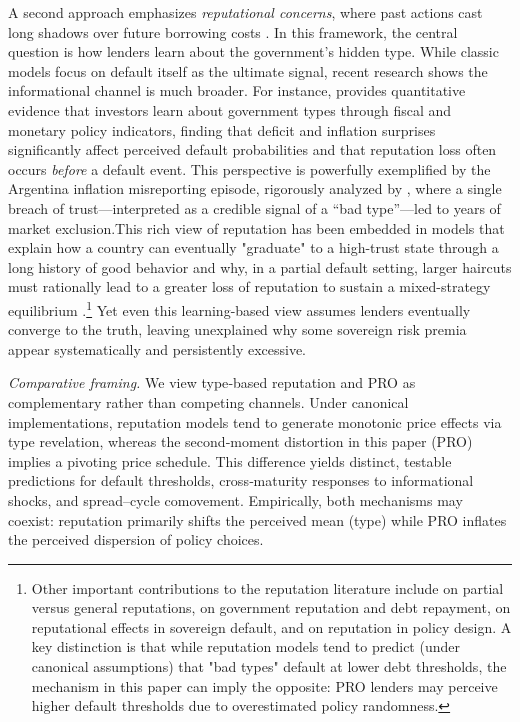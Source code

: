 \documentclass[12pt]{article}
\theoremstyle{plain}
\begin{document}
A second approach emphasizes \textit{reputational concerns}, where past actions
cast long shadows over future borrowing costs \citep{ColeDowEnglish1995,
	Phelan2006}. In this framework, the central question is how lenders learn about
the government's hidden type. While classic models focus on default itself as
the ultimate signal, recent research shows the informational channel is much
broader. For instance, \citep{Fourakis2021} provides quantitative evidence that
investors learn about government types through fiscal and monetary policy
indicators, finding that deficit and inflation surprises significantly affect
perceived default probabilities and that reputation loss often occurs
\textit{before} a default event. This perspective is powerfully exemplified by
the Argentina inflation misreporting episode, rigorously analyzed by
\citep{MorelliMoretti2023}, where a single breach of trust—interpreted as a
credible signal of a ``bad type''—led to years of market exclusion.This rich
view of reputation has been embedded in models that explain how a country can
eventually "graduate" to a high-trust state through a long history of good
behavior \citep{AmadorPhelan2021} and why, in a partial default setting, larger
haircuts must rationally lead to a greater loss of reputation to sustain a
mixed-strategy equilibrium \citep{AmadorPhelan2023}.\footnote{Other important
	contributions to the reputation literature include \citep{ColeKehoe1998} on
	partial versus general reputations, \citep{DErasmo2011} on government
	reputation and debt repayment, \citep{EgorovFabinger2016} on reputational
	effects in sovereign default, and \citep{DovisKirpalani2020,
		DovisKirpalani2021} on reputation in policy design. A key distinction is that
	while reputation models tend to predict (under canonical assumptions) that "bad
	types" default at lower debt thresholds, the mechanism in this paper can imply
	the opposite: PRO lenders may perceive higher default thresholds due to
	overestimated policy randomness.} Yet even this learning-based view assumes
lenders eventually converge to the truth, leaving unexplained why some
sovereign risk premia appear systematically and persistently excessive.

\noindent\textit{Comparative framing.} We view type‑based reputation and PRO as complementary rather than competing channels. Under canonical implementations, reputation models tend to generate monotonic price effects via type revelation, whereas the second‑moment distortion in this paper (PRO) implies a pivoting price schedule. This difference yields distinct, testable predictions for default thresholds, cross‑maturity responses to informational shocks, and spread–cycle comovement. Empirically, both mechanisms may coexist: reputation primarily shifts the perceived mean (type) while PRO inflates the perceived dispersion of policy choices.
\end{document}
